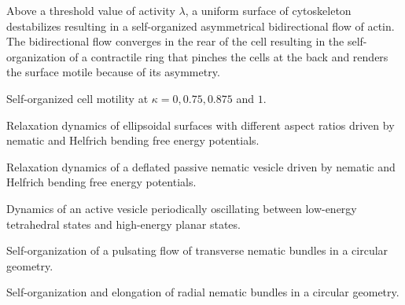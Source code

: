 \bigskip

 \quad Above a threshold value of activity $\lambda$, a uniform surface of cytoskeleton destabilizes resulting in a self-organized asymmetrical bidirectional flow of actin. The bidirectional flow converges in the rear of the cell resulting in the self-organization of a contractile ring that pinches the cells at the back and renders the surface motile because of its asymmetry.




\bigskip

 \quad Self-organized cell motility at $\kappa=0,0.75,0.875$  and $1.$



\bigskip

 \quad Relaxation dynamics of ellipsoidal surfaces with different aspect ratios driven by nematic and Helfrich bending free energy potentials.

\bigskip
{} \quad Relaxation dynamics of a deflated passive nematic vesicle driven by nematic and Helfrich bending free energy potentials.

\bigskip
{} \quad Dynamics of an active vesicle periodically oscillating between low-energy tetrahedral states and high-energy planar states.

\bigskip

 \quad Self-organization of a pulsating flow of transverse nematic bundles in a circular geometry.


\bigskip

 \quad Self-organization and elongation of radial nematic bundles in a circular geometry.



\newpage











